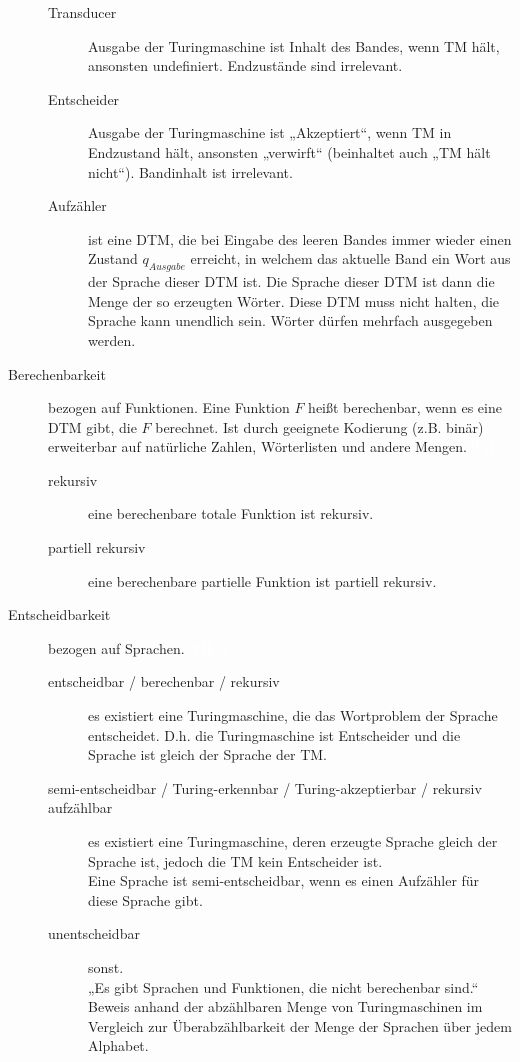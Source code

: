 \documentclass[a4paper,10pt]{article}
\newcommand{\vl}[1]{\colorbox{vl}{\textcolor{white}{\small\textbf{#1}}}}
\begin{document}
\begin{description}
\begin{description}
				\item[Transducer] Ausgabe der Turingmaschine ist Inhalt des Bandes, wenn TM hält, ansonsten undefiniert. Endzustände sind irrelevant.
				\item[Entscheider] Ausgabe der Turingmaschine ist „Akzeptiert“, wenn TM in Endzustand hält, ansonsten „verwirft“ (beinhaltet auch „TM hält nicht“). Bandinhalt ist irrelevant.
				\item[Aufzähler] ist eine DTM, die bei Eingabe des leeren Bandes immer wieder einen Zustand $q_{Ausgabe}$ erreicht, in welchem das aktuelle Band ein Wort aus der Sprache dieser DTM ist. Die Sprache dieser DTM ist dann die Menge der so erzeugten Wörter. Diese DTM muss nicht halten, die Sprache kann unendlich sein. Wörter dürfen mehrfach ausgegeben werden.
            \end{description}
            
		\item[Berechenbarkeit] bezogen auf Funktionen. Eine Funktion $F$ heißt berechenbar, wenn es eine DTM gibt, die $F$ berechnet. Ist durch geeignete Kodierung (z.B. binär) erweiterbar auf natürliche Zahlen, Wörterlisten und andere Mengen. \vl{TIL 2}
			\begin{description}
				\item[rekursiv] eine berechenbare totale Funktion ist rekursiv.
				\item[partiell rekursiv] eine berechenbare partielle Funktion ist partiell rekursiv.
			\end{description}
			
		\item[Entscheidbarkeit] bezogen auf Sprachen. \vl{TIL 2}
			\begin{description}
				\item[entscheidbar / berechenbar / rekursiv] es existiert eine Turingmaschine, die das Wortproblem der Sprache entscheidet. D.h. die Turingmaschine ist Entscheider und die Sprache ist gleich der Sprache der TM.
				\item[semi-entscheidbar / Turing-erkennbar / Turing-akzeptierbar / rekursiv aufzählbar] es existiert eine Turingmaschine, deren erzeugte Sprache gleich der Sprache ist, jedoch die TM kein Entscheider ist. \\
				Eine Sprache ist semi-entscheidbar, wenn es einen Aufzähler für diese Sprache gibt.
				\item[unentscheidbar] sonst. \\
					„Es gibt Sprachen und Funktionen, die nicht berechenbar sind.“ Beweis anhand der abzählbaren Menge von Turingmaschinen im Vergleich zur Überabzählbarkeit der Menge der Sprachen über jedem Alphabet.
			\end{description}
		

\end{description}
\end{document}
